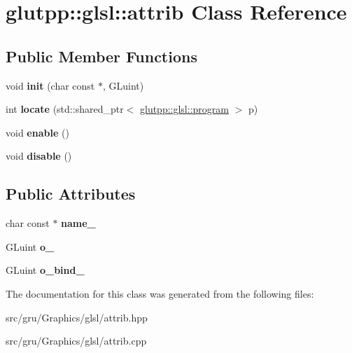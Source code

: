 \hypertarget{classglutpp_1_1glsl_1_1attrib}{\section{glutpp\-:\-:glsl\-:\-:attrib \-Class \-Reference}
\label{classglutpp_1_1glsl_1_1attrib}
}
\subsection*{\-Public \-Member \-Functions}
\begin{DoxyCompactItemize}
\item 
\hypertarget{classglutpp_1_1glsl_1_1attrib_ad6cd70902fcafda280444fa1aed5d7f9}{void {\bfseries init} (char const $\ast$, \-G\-Luint)}\label{classglutpp_1_1glsl_1_1attrib_ad6cd70902fcafda280444fa1aed5d7f9}

\item 
\hypertarget{classglutpp_1_1glsl_1_1attrib_adf090262039d4ec3c02bedf95f749cb8}{int {\bfseries locate} (std\-::shared\-\_\-ptr$<$ \hyperlink{classglutpp_1_1glsl_1_1program}{glutpp\-::glsl\-::program} $>$ p)}\label{classglutpp_1_1glsl_1_1attrib_adf090262039d4ec3c02bedf95f749cb8}

\item 
\hypertarget{classglutpp_1_1glsl_1_1attrib_a787f4a60c290234fd0f6dc3b17df090c}{void {\bfseries enable} ()}\label{classglutpp_1_1glsl_1_1attrib_a787f4a60c290234fd0f6dc3b17df090c}

\item 
\hypertarget{classglutpp_1_1glsl_1_1attrib_a01fc89c183e17a5878e5bfc0ccc613c9}{void {\bfseries disable} ()}\label{classglutpp_1_1glsl_1_1attrib_a01fc89c183e17a5878e5bfc0ccc613c9}

\end{DoxyCompactItemize}
\subsection*{\-Public \-Attributes}
\begin{DoxyCompactItemize}
\item 
\hypertarget{classglutpp_1_1glsl_1_1attrib_af8ab9f06c05904695042afaa75d610e1}{char const $\ast$ {\bfseries name\-\_\-}}\label{classglutpp_1_1glsl_1_1attrib_af8ab9f06c05904695042afaa75d610e1}

\item 
\hypertarget{classglutpp_1_1glsl_1_1attrib_aafb165178e04753d569922c62213f34d}{\-G\-Luint {\bfseries o\-\_\-}}\label{classglutpp_1_1glsl_1_1attrib_aafb165178e04753d569922c62213f34d}

\item 
\hypertarget{classglutpp_1_1glsl_1_1attrib_a6dfc7a7358faaee15f8cb2d40130f693}{\-G\-Luint {\bfseries o\-\_\-bind\-\_\-}}\label{classglutpp_1_1glsl_1_1attrib_a6dfc7a7358faaee15f8cb2d40130f693}

\end{DoxyCompactItemize}


\-The documentation for this class was generated from the following files\-:\begin{DoxyCompactItemize}
\item 
src/gru/\-Graphics/glsl/attrib.\-hpp\item 
src/gru/\-Graphics/glsl/attrib.\-cpp\end{DoxyCompactItemize}
